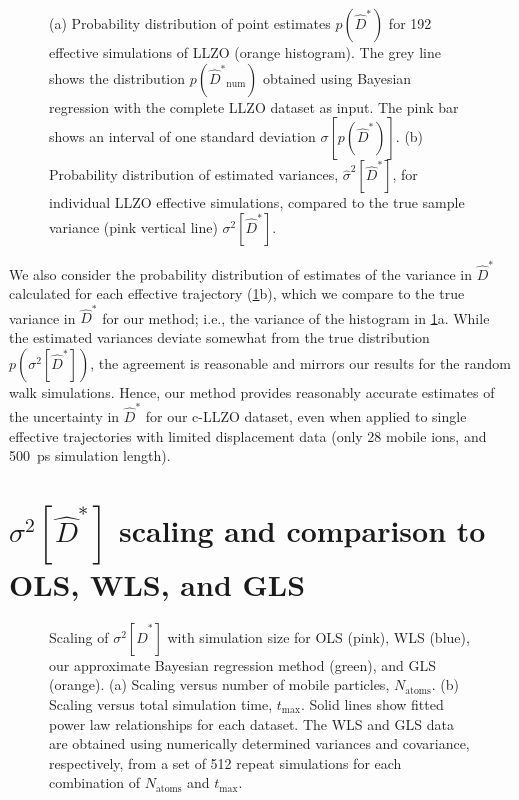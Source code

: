 \documentclass[reprint,superscriptaddress,nobibnotes,amsmath,amssymb,aps,prx,hidelinks]{revtex4-2}
\newcommand{\prob}[1]{\ensuremath{p(#1)}}
\newcommand{\Dest}{\ensuremath{\widehat{D}^*}}
\newcommand{\var}[1]{\ensuremath{\sigma^2[#1]}}
\newcommand{\varest}[1]{\ensuremath{\widehat{\sigma}^2[#1]}}
\begin{document}
\begin{figure}[tb]
    \centering
    \caption{
      (a) Probability distribution of point estimates $\prob{\Dest}$ for \num{192} effective simulations of LLZO (orange histogram).
      The grey line shows the distribution $\prob{\Dest_\mathrm{num}}$ obtained using Bayesian regression with the complete LLZO dataset as input.
      The pink bar shows an interval of one standard deviation $\sigma[\prob{\Dest}]$.
      (b) Probability distribution of estimated variances, $\varest{\Dest}$, for individual LLZO effective simulations, compared to the true sample variance (pink vertical line) $\var{\Dest}$.
    }
    \label{fig:diffusion}
\end{figure}

We also consider the probability distribution of estimates of the variance in $\Dest$ calculated for each effective trajectory (\cref{fig:diffusion}b), which we compare to the true variance in $\Dest$ for our method; i.e., the variance of the histogram in \cref{fig:diffusion}a.
While the estimated variances deviate somewhat from the true distribution $\prob{\var{\Dest}}$, the agreement is reasonable and mirrors our results for the random walk simulations.
Hence, our method provides reasonably accurate estimates of the uncertainty in $\Dest$ for our c-LLZO dataset, even when applied to single effective trajectories with limited displacement data (only 28 mobile ions, and \SI{500}{ps} simulation length).

\section{$\var{\Dest}$ scaling and comparison to OLS, WLS, and GLS}

\begin{figure}[htb]
    \centering
    \caption{
      Scaling of $\var{\Dest}$ with simulation size for OLS (pink), WLS (blue), our approximate Bayesian regression method (green), and GLS (orange).
      (a) Scaling versus number of mobile particles, $N_\mathrm{atoms}$.
      (b) Scaling versus total simulation time, $t_\mathrm{max}$.
      Solid lines show fitted power law relationships for each dataset.
      The WLS and GLS data are obtained using numerically determined variances and covariance, respectively, from a set of \num{512} repeat simulations for each combination of $N_\mathrm{atoms}$ and $t_\mathrm{max}$.
    }
    \label{fig:stat_eff}
\end{figure}
\end{document}
